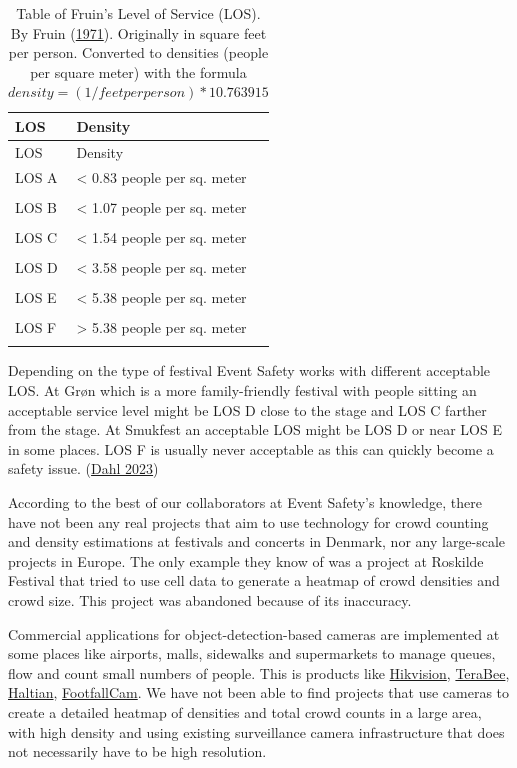 \documentclass[
]{article}
\begin{document}
\hypertarget{tbl-los}{}
\begin{longtable}[]{@{}ll@{}}
\toprule\noalign{}
LOS & Density \\
\midrule\noalign{}
\endfirsthead
\toprule\noalign{}
LOS & Density \\
\midrule\noalign{}
\endhead
\bottomrule\noalign{}
\endlastfoot
LOS A & \textless{} 0.83 people per sq. meter \\
& \\
LOS B & \textless{} 1.07 people per sq. meter \\
& \\
LOS C & \textless{} 1.54 people per sq. meter \\
& \\
LOS D & \textless{} 3.58 people per sq. meter \\
& \\
LOS E & \textless{} 5.38 people per sq. meter \\
& \\
LOS F & \textgreater{} 5.38 people per sq. meter \\
\caption{\label{tbl-los}Table of Fruin's Level of Service (LOS). By
Fruin (\protect\hyperlink{ref-fruin1971pedestrian}{1971}). Originally in
square feet per person. Converted to densities (people per square meter)
with the formula
\(density=(1/feet per person)*10.763915\)}\tabularnewline
\end{longtable}

Depending on the type of festival Event Safety works with different
acceptable LOS. At Grøn which is a more family-friendly festival with
people sitting an acceptable service level might be LOS D close to the
stage and LOS C farther from the stage. At Smukfest an acceptable LOS
might be LOS D or near LOS E in some places. LOS F is usually never
acceptable as this can quickly become a safety issue.
(\protect\hyperlink{ref-dahl2023crowd}{Dahl 2023})

According to the best of our collaborators at Event Safety's knowledge,
there have not been any real projects that aim to use technology for
crowd counting and density estimations at festivals and concerts in
Denmark, nor any large-scale projects in Europe. The only example they
know of was a project at Roskilde Festival that tried to use cell data
to generate a heatmap of crowd densities and crowd size. This project
was abandoned because of its inaccuracy.

Commercial applications for object-detection-based cameras are
implemented at some places like airports, malls, sidewalks and
supermarkets to manage queues, flow and count small numbers of people.
This is products like
\href{https://www.hikvision.com/en/solutions/solutions-by-function/people-counting/}{Hikvision},
\href{https://www.terabee.com/products/people-counting/}{TeraBee},
\href{https://haltian.com/products/people-counting/}{Haltian},
\href{https://www.footfallcam.com/}{FootfallCam}. We have not been able
to find projects that use cameras to create a detailed heatmap of
densities and total crowd counts in a large area, with high density and
using existing surveillance camera infrastructure that does not
necessarily have to be high resolution.
\end{document}
